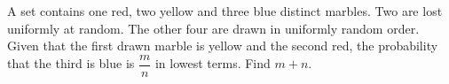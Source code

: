 A set contains one red, two yellow and three blue distinct marbles. Two are lost uniformly at random. The other four are drawn in uniformly random order. Given that the first drawn marble is yellow and the second red, the probability that the third is blue is $\dfrac{m}{n}$ in lowest terms. Find $m+n$.
